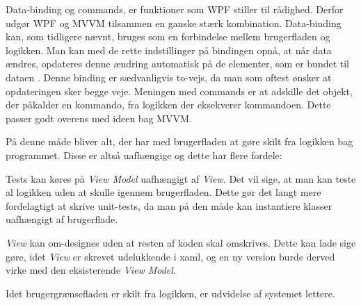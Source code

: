 Data-binding og commands, er  funktioner som WPF stiller til rådighed. Derfor udgør WPF og MVVM tilsammen en ganske stærk kombination. Data-binding kan, som tidligere nævnt, bruges som en forbindelse mellem brugerfladen og logikken. Man kan med de rette indstillinger på bindingen opnå, at når data ændres, opdateres denne ændring automatisk på de elementer, som er bundet til dataen \cite{msdn-databinding}. Denne binding er sædvanligvis to-vejs, da man som oftest ønsker at opdateringen sker begge veje. 
Meningen med commands er at adskille det objekt, der påkalder en kommando, fra logikken der eksekverer kommandoen. Dette passer godt overens med ideen bag MVVM. 

På denne måde bliver alt, der har med brugerfladen at gøre skilt fra logikken bag programmet. Disse er altså uafhængige og dette har flere fordele:

\itemize

\item {Tests kan køres på \textit{View Model} uafhængigt af \textit{View}.}
Det vil sige, at man kan teste al logikken uden at skulle igennem brugerfladen. Dette gør det langt mere fordelagtigt at skrive unit-tests, da man på den måde kan instantiere klasser uafhængigt af brugerflade.
\item{\textit{View} kan om-designes uden at resten af koden skal omskrives.}
Dette kan lade sige gøre, idet \textit{View} er skrevet udelukkende i xaml, og en ny version burde derved virke med den eksisterende \textit{View Model}.
\item{Idet brugergrænsefladen er skilt fra logikken, er udvidelse af systemet lettere.\cite{msdn1}}

\enditemize

